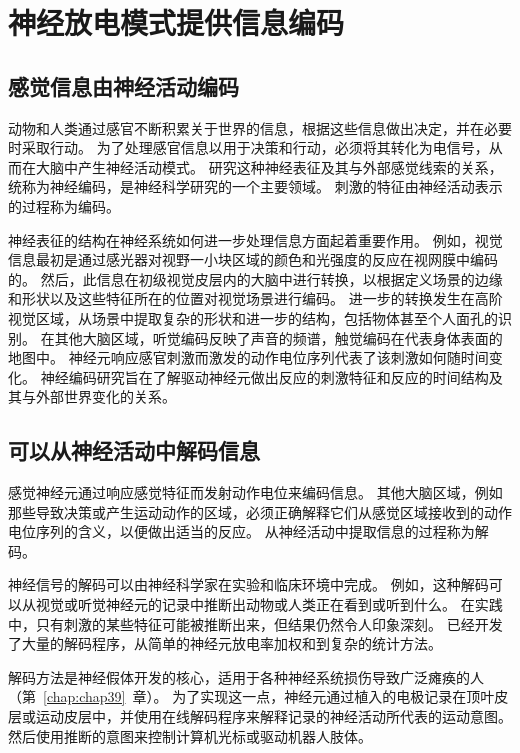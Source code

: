 \section{神经放电模式提供信息编码}

\subsection{感觉信息由神经活动编码}

动物和人类通过感官不断积累关于世界的信息，根据这些信息做出决定，并在必要时采取行动。
为了处理感官信息以用于决策和行动，必须将其转化为电信号，从而在大脑中产生神经活动模式。
研究这种神经表征及其与外部感觉线索的关系，统称为神经编码，是神经科学研究的一个主要领域。
刺激的特征由神经活动表示的过程称为编码。


神经表征的结构在神经系统如何进一步处理信息方面起着重要作用。
例如，视觉信息最初是通过感光器对视野一小块区域的颜色和光强度的反应在视网膜中编码的。
然后，此信息在初级视觉皮层内的大脑中进行转换，以根据定义场景的边缘和形状以及这些特征所在的位置对视觉场景进行编码。
进一步的转换发生在高阶视觉区域，从场景中提取复杂的形状和进一步的结构，包括物体甚至个人面孔的识别。
在其他大脑区域，听觉编码反映了声音的频谱，触觉编码在代表身体表面的地图中。
神经元响应感官刺激而激发的动作电位序列代表了该刺激如何随时间变化。
神经编码研究旨在了解驱动神经元做出反应的刺激特征和反应的时间结构及其与外部世界变化的关系。



\subsection{可以从神经活动中解码信息}

感觉神经元通过响应感觉特征而发射动作电位来编码信息。
其他大脑区域，例如那些导致决策或产生运动动作的区域，必须正确解释它们从感觉区域接收到的动作电位序列的含义，以便做出适当的反应。
从神经活动中提取信息的过程称为解码。


神经信号的解码可以由神经科学家在实验和临床环境中完成。
例如，这种解码可以从视觉或听觉神经元的记录中推断出动物或人类正在看到或听到什么。
在实践中，只有刺激的某些特征可能被推断出来，但结果仍然令人印象深刻。
已经开发了大量的解码程序，从简单的神经元放电率加权和到复杂的统计方法。


解码方法是神经假体开发的核心，适用于各种神经系统损伤导致广泛瘫痪的人（第~\ref{chap:chap39}~章）。
为了实现这一点，神经元通过植入的电极记录在顶叶皮层或运动皮层中，并使用在线解码程序来解释记录的神经活动所代表的运动意图。
然后使用推断的意图来控制计算机光标或驱动机器人肢体。


